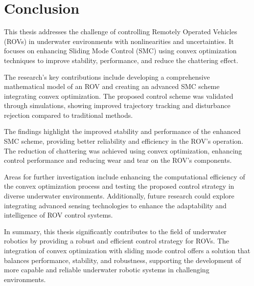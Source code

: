 \chapter{Conclusion}
\label{chap:conclusion}

This thesis addresses the challenge of controlling Remotely Operated Vehicles (ROVs) in underwater environments with nonlinearities and uncertainties. It focuses on enhancing Sliding Mode Control (SMC) using convex optimization techniques to improve stability, performance, and reduce the chattering effect.

The research's key contributions include developing a comprehensive mathematical model of an ROV and creating an advanced SMC scheme integrating convex optimization. The proposed control scheme was validated through simulations, showing improved trajectory tracking and disturbance rejection compared to traditional methods.

The findings highlight the improved stability and performance of the enhanced SMC scheme, providing better reliability and efficiency in the ROV's operation. The reduction of chattering was achieved using convex optimization, enhancing control performance and reducing wear and tear on the ROV's components.

Areas for further investigation include enhancing the computational efficiency of the convex optimization process and testing the proposed control strategy in diverse underwater environments. Additionally, future research could explore integrating advanced sensing technologies to enhance the adaptability and intelligence of ROV control systems.

In summary, this thesis significantly contributes to the field of underwater robotics by providing a robust and efficient control strategy for ROVs. The integration of convex optimization with sliding mode control offers a solution that balances performance, stability, and robustness, supporting the development of more capable and reliable underwater robotic systems in challenging environments.


